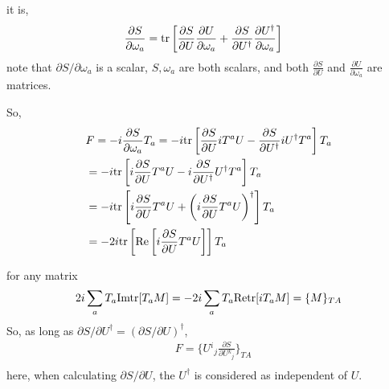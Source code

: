 it is,
\begin{equation}
\begin{split}
&\frac{\partial S}{\partial \omega _a}={\rm tr}\left[\frac{\partial S}{\partial U}\frac{\partial U}{\partial \omega_a}+\frac{\partial S}{\partial U^{\dagger}}\frac{\partial U^{\dagger}}{\partial \omega_a}\right]
\end{split}
\end{equation}
note that $\partial S/\partial \omega _a$ is a scalar, $S,\omega _a$ are both scalars, and both $\frac{\partial S}{\partial U}$ and $\frac{\partial U}{\partial \omega_a}$ are matrices.

So,
\begin{equation}
\begin{split}
&F=-i\frac{\partial S}{\partial \omega _a}T_a=-i{\rm tr}\left[\frac{\partial S}{\partial U}iT^aU-\frac{\partial S}{\partial U^{\dagger}}iU^{\dagger}T^a\right]T_a\\
&=-i{\rm tr}\left[i\frac{\partial S}{\partial U}T^aU-i\frac{\partial S}{\partial U^{\dagger}}U^{\dagger}T^a\right]T_a\\
&=-i{\rm tr}\left[i\frac{\partial S}{\partial U}T^aU+\left(i\frac{\partial S}{\partial U}T^aU\right)^{\dagger}\right]T_a\\
&=-2i{\rm tr}\left[{\rm Re}\left[i\frac{\partial S}{\partial U}T^aU\right]\right]T_a\\
\end{split}
\end{equation}

for any matrix \textcolor[rgb]{0,0,1}{
\begin{equation}
\begin{split}
&2i \sum _a T_a {\rm Im tr}[T_a M] = -2 i \sum _a T_a {\rm Re tr}[i T_a M] = \{M\}_{TA}\\
\end{split}
\end{equation}
}
So, \textcolor[rgb]{0,0,1}{as long as $\partial S / \partial U^{\dagger} = \left(\partial S/ \partial U\right)^{\dagger}$,
\begin{equation}
\begin{split}
&F= \{U{}^i{}_j \frac{\partial S}{\partial U{}^k{}_j}\}_{TA}\\
\end{split}
\end{equation}
here, when calculating $\partial S/ \partial U$, the $U^{\dagger}$ is considered as independent of $U$.}

